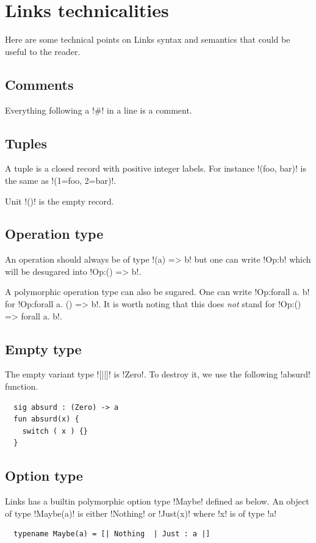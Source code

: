\documentclass[11pt, nonacm=true, language=french, language=english]{acmart}
\begin{document}
\section{Links technicalities}
\label{sec:tech}

Here are some technical points on Links syntax and semantics that could be useful to the reader.

\subsection{Comments}
\label{sec:comments}
Everything following a !#! in a line is a comment.

\subsection{Tuples}
\label{sec:tuples}
A tuple is a closed record with positive integer labels. For instance !(foo, bar)! is the same as !(1=foo, 2=bar)!.

Unit !()! is the empty record.


\subsection{Operation type}
\label{sec:operation-type}
An operation should always be of type !(a) => b! but one can write !Op:b! which will be desugared into !Op:() => b!.

A polymorphic operation type can also be sugared. One can write !Op:forall a. b! for !Op:forall a. () => b!. It is worth noting that this does \emph{not} stand for !Op:() => forall a. b!.

\subsection{Empty type}
\label{sec:tech:zero}
The empty variant type ![||]! is !Zero!. To destroy it, we use the following !absurd! function.
\begin{lstlisting}
  sig absurd : (Zero) -> a
  fun absurd(x) {
    switch ( x ) {}
  }
\end{lstlisting}

\subsection{Option type}
\label{sec:tech:maybe}
Links has a builtin polymorphic option type !Maybe! defined as below. An object of type !Maybe(a)! is either !Nothing! or !Just(x)! where !x! is of type !a!
\begin{lstlisting}
  typename Maybe(a) = [| Nothing  | Just : a |]
\end{lstlisting}
\end{document}
